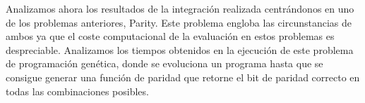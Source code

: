 Analizamos ahora los resultados de la integración realizada centrándonos en uno de los problemas anteriores, Parity. Este problema engloba las circunstancias de ambos ya que el coste computacional de la evaluación en estos problemas es despreciable. Analizamos los tiempos obtenidos en la ejecución de este problema de programación genética, donde se evoluciona un programa hasta que se consigue generar una función de paridad que retorne el bit de paridad correcto en todas las combinaciones posibles.
